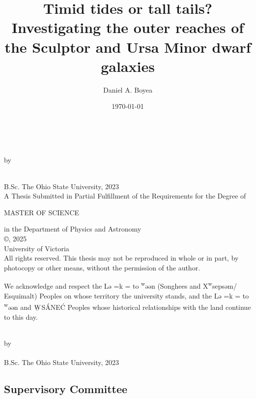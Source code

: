 \documentclass[12pt,oneside,letterpaper]{report}
\title{Timid tides or tall tails? \\
    Investigating the outer reaches of the Sculptor and Ursa Minor dwarf galaxies
}
\author{Daniel A. Boyea}
\date{\today}
\newcommand{\schwa}{ə}
\newcommand{\Lekwnen}{L\schwa{}\overcomma{k}\textsuperscript{w}\schwa{}\ng{}\schwa{}n}
\newcommand{\skipline}{\vspace{\baselineskip}}
\def\overcomma#1{%
  \setbox0=\hbox{#1}%
  \dimen0=\wd0       %
  \vbox{%
    \hbox to \dimen0{\hfil,\hfil}%
    \nointerlineskip            %
    \box0                       %
  }%
}
\begin{document}


\makeatletter
\begin{titlepage}
   \begin{center}
       \textbf{\large \@title}\\
        \skipline

        by\\
        \skipline

       \@author\\
       B.Sc. The Ohio State University, 2023\\
       \vspace*{3\baselineskip}
    A Thesis Submitted in Partial Fulfillment of the Requirements for the Degree of\\
    \skipline

    MASTER OF SCIENCE \\
    \skipline

    in the Department of Physics and Astronomy\\
       \vfill
       {\small
       ©\@author, 2025\\
       University of Victoria\\
   }
   \skipline
       {\small
       All rights reserved. This thesis may not be reproduced in whole or in part,
   by photocopy or other means, without the permission of the author.} \\
\skipline
   \end{center}
We acknowledge and respect the \Lekwnen{} (Songhees and X\textsuperscript{w}seps\schwa{}m/
Esquimalt) Peoples on whose territory the university stands, and the
\Lekwnen{} and ${\underaccent{\bar}{\rm W}}$S\'ANE\'C Peoples whose historical relationships with the
land continue to this day. 
\end{titlepage}

\addtocounter{page}{1}


\begin{centering}
\textbf{\@title}\\
\skipline
by\\
\skipline
\@author\\
B.Sc. The Ohio State University, 2023\\
\vspace*{3\baselineskip}
\end{centering}

\subsection*{Supervisory Committee}
\skipline
\end{document}
